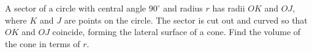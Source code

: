 A sector of a circle with central angle $90^\circ$ and radius $r$ has radii $OK$ and $OJ$, where $K$ and $J$ are points on the circle. The sector is cut out and curved so that $OK$ and $OJ$ coincide, forming the lateral surface of a cone. Find the volume of the cone in terms of $r$.
